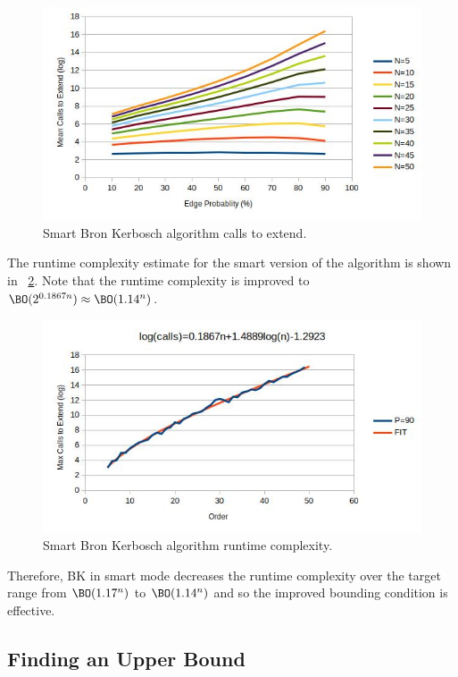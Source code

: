 \begin{figure}[H]
  \centering
  \includegraphics[width=5in]{bron1_calls}
  \caption{Smart Bron Kerbosch algorithm calls to extend.}
  \label{fig:bron2:calls}
\end{figure}

The runtime complexity estimate for the smart version of the algorithm is shown in
\figurename~\ref{fig:bron2:runtime}.  Note that the runtime complexity is improved to
\(\BO(2^{0.1867n})\approx\BO(1.14^n)\).

\begin{figure}[H]
  \centering
  \includegraphics[width=5in]{bron2_runtime}
  \caption{Smart Bron Kerbosch algorithm runtime complexity.}
  \label{fig:bron2:runtime}
\end{figure}

Therefore, BK in smart mode decreases the runtime complexity over the target range from \(\BO(1.17^n)\) to
\(\BO(1.14^n)\) and so the improved bounding condition is effective.

\subsection{Finding an Upper Bound}\label{sec:sub:upper}

